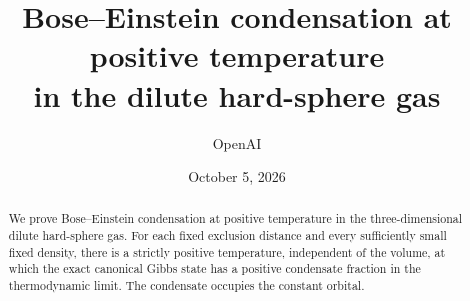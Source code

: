 \documentclass[11pt]{article}
\title{Bose--Einstein condensation at positive temperature\\in the dilute hard-sphere gas}
\author{OpenAI}
\date{October 5, 2026}
\numberwithin{equation}{section}
\theoremstyle{definition}
\theoremstyle{remark}
\begin{document}
\maketitle
\begin{abstract}
We prove Bose--Einstein condensation at positive temperature in the
three-dimensional dilute hard-sphere gas. For each fixed exclusion distance
and every sufficiently small fixed density, there is a strictly positive
temperature, independent of the volume, at which the exact canonical Gibbs
state has a positive condensate fraction in the thermodynamic limit.
The condensate occupies the constant orbital.
\end{abstract}
\tableofcontents












\end{document}
